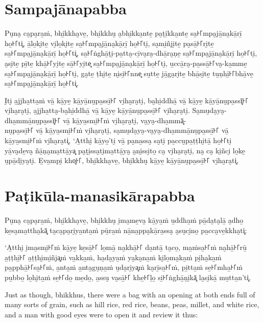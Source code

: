\paliPage
\section*{Sampajānapabba}

Pu̮na̮ ca̮pa̮ra̱ṁ, bhi̱kkha̮ve̱, bhi̱kkhu̮ a̮bhi̱kka̱nte̱ pa̮ṭi̱kka̱nte̱ sa̱꜔꜒mpa̮jā̱na̮kā̱rī̱ ho̱꜔꜒ti͓,
ā̱lo̱ki̮te̱ vi̮lo̱ki̮te̱ sa̱꜔꜒mpa̮jā̱na̮kā̱rī̱ ho̱꜔꜒ti̮, sa̮mi̱ñji̮te̱ pa̮sā̱꜔꜒ri̮te̱ sa̱꜔꜒mpa̮jā̱na̮kā̱rī̱ ho̱꜔꜒ti͓,
sa̱꜔꜒ṅghā̱ṭi̮-pa̱tta̮-cī̱va̮ra̮-dhā̱ra̮ṇe̱ sa̱꜔꜒mpa̮jā̱na̮kā̱rī̱ ho̱꜔꜒ti̮, a̮si̮te̱ pī̱te̱ khā̱꜔꜒yi̮te̱ sā̱꜔꜒yi̮te͓
sa̱꜔꜒mpa̮jā̱na̮kā̱rī̱ ho̱꜔꜒ti̮, u̱ccā̱ra̮-pa̱ssā̱꜔꜒va̮-ka̱mme̱ sa̱꜔꜒mpa̮jā̱na̮kā̱rī̱ ho̱꜔꜒ti̮, ga̮te̱ ṭhi̮te̱ ni̮si̱꜔꜒nne͓
su̱tte̱ jā̱ga̮ri̮te̱ bhā̱si̮te̱ tu̱ṇhī̱꜔꜒bhā̱ve̱ sa̱꜔꜒mpa̮jā̱na̮kā̱rī̱ ho̱꜔꜒ti͓.

I̮ti̮ a̱jjha̱tta̱ṁ vā̱ kā̱ye̱ kā̱yā̱nu̮pa̱ssī̱꜔꜒ vi̮ha̮ra̮ti̮, ba̮hi̱ddhā̱ vā̱ kā̱ye̱ kā̱yā̱nu̮pa̱ssī͓꜔꜒
vi̮ha̮ra̮ti̮, a̱jjha̱tta̮-ba̮hi̱ddhā̱ vā̱ kā̱ye̱ kā̱yā̱nu̮pa̱ssī̱꜔꜒ vi̮ha̮ra̮ti̮. Sa̮mu̮da̮ya̮-dha̱mmā̱nu̮pa̱ssī͓꜔꜒
vā̱ kā̱ya̱smi̱꜔꜒ṁ vi̮ha̮ra̮ti̮, va̮ya̮-dha̱mmā͓-\\
nu̮pa̱ssī̱꜔꜒ vā̱ kā̱ya̱smi̱꜔꜒ṁ vi̮ha̮ra̮ti̮, sa̮mu̮da̮ya̮-va̮ya̮-dha̱mmā̱nu̮pa̱ssī̱꜔꜒ vā̱ kā̱ya̱smi̱꜔꜒ṁ vi̮ha̮ra̮ti͓.
‘A̱tthi̮ kā̱yo̱’ti̮ vā̱ pa̮na̱ssa̮ sa̮ti̮ pa̱ccu̮pa̱ṭṭhi̮tā̱ ho̱꜔꜒ti̮ yā̱va̮de̱va̮ ñā̱ṇa̮ma̱ttā̱ya͓
pa̮ṭi̱ssa̮ti̮ma̱ttā̱ya̮ a̮ni̱ssi̮to̱ ca̮ vi̮ha̮ra̮ti̮, na̮ ca̮ ki̱ñci̮ lo̱ke̱ u̮pā̱di̮ya̮ti̮. E̱va̱mpi̮ kho͓꜔꜒,
bhi̱kkha̮ve̱, bhi̱kkhu̮ kā̱ye̱ kā̱yā̱nu̮pa̱ssī̱꜔꜒ vi̮ha̮ra̮ti͓.


\section*{Paṭikūla-manasikārapabba}

Pu̮na̮ ca̮pa̮ra̱ṁ, bhi̱kkha̮ve̱, bhi̱kkhu̮ i̮ma̮me̱va̮ kā̱ya̱ṁ u̱ddha̱ṁ pā̱da̮ta̮lā̱ a̮dho̱ ke̱sa̮ma̱ttha̮kā͓
ta̮ca̮pa̮ri̮ya̱nta̱ṁ pū̱ra̱ṁ nā̱na̱ppa̮kā̱ra̱ssa̮ a̮su̮ci̮no̱ pa̱cca̮ve̱kkha̮ti͓:

‘A̱tthi̮ i̮ma̱smi̱꜔꜒ṁ kā̱ye̱ ke̱sā̱꜔꜒ lo̱mā̱ na̮khā̱꜔꜒ da̱ntā̱ ta̮co̱, ma̱ṁsa̱꜔꜒ṁ na̮hā̱꜔꜒rū̱ a̱ṭṭhī̱꜔꜒ a̱ṭṭhi̮mi̱ñja͓ṁ
va̱kka̱ṁ, ha̮da̮ya̱ṁ ya̮ka̮na̱ṁ ki̮lo̱ma̮ka̱ṁ pi̮ha̮ka̱ṁ pa̱pphā̱꜔꜒sa̱꜔꜒ṁ, a̱nta̱ṁ a̱nta̮gu̮ṇa̱ṁ u̮da̮ri̮ya͓ṁ
ka̮rī̱sa̱꜔꜒ṁ, pi̱tta̱ṁ se̱꜔꜒mha̱꜔꜒ṁ pu̱bbo̱ lo̱hi̮ta̱ṁ se̱꜔꜒do̱ me̱do̱, a̱ssu̮ va̮sā̱꜔꜒ khe̱꜔꜒ḷo̱ si̱꜔꜒ṅghā̱ṇi̮kā͓
la̮si̮kā̱ mu̱tta̱n’ti͓.

\englishPage

Just as though, bhikkhus, there were a bag with an opening at both ends full of
many sorts of grain, such as hill rice, red rice, beans, peas, millet, and white
rice, and a man with good eyes were to open it and review it thus:

